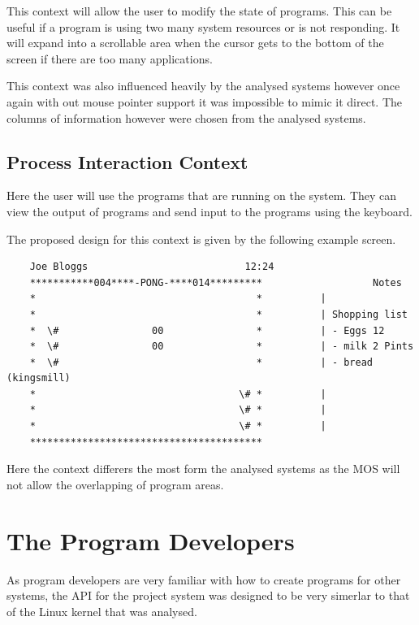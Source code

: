 \documentclass[a4paper]{report}
\begin{document}
This context will allow the user to modify the state of programs. This can be useful if a program is using two many system resources or is not responding. It will expand into a scrollable area when the cursor gets to the bottom of the screen if there are too many applications.

This context was also influenced heavily by the analysed systems however once again with out mouse pointer support it was impossible to mimic it direct. The columns of information however were chosen from the analysed systems.

\subsection{Process Interaction Context}

Here the user will use the programs that are running on the system. They can view the output of programs and send input to the programs using the keyboard.

The proposed design for this context is given by the following example screen.

{\ttfamily \small
  \begin{framed}
    \begin{verbatim}
    Joe Bloggs                           12:24
    ***********004****-PONG-****014*********                   Notes
    *                                      *          |
    *                                      *          | Shopping list
    *  \#                00                *          | - Eggs 12
    *  \#                00                *          | - milk 2 Pints
    *  \#                                  *          | - bread (kingsmill)
    *                                   \# *          |
    *                                   \# *          |
    *                                   \# *          |
    ****************************************
    \end{verbatim}
  \end{framed}
}

Here the context differers the most form the analysed systems as the MOS will not allow the overlapping of program areas.



\section{The Program Developers}

As program developers are very familiar with how to create programs for other systems, the API for the project system was designed to be very simerlar to that of the Linux kernel that was analysed.
\end{document}
